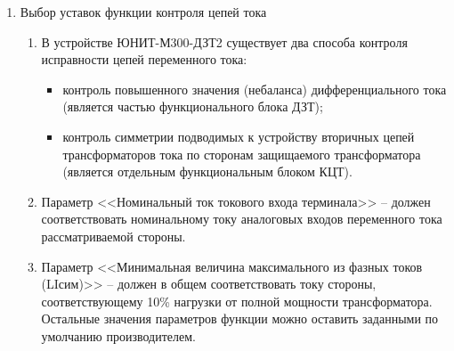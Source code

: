 \begin{enumerate}[label=\arabic{section}.\arabic{enumi}, labelsep=7pt, leftmargin=0pt, itemindent=60pt, align=left, nosep]
\item Выбор уставок функции контроля цепей тока
\begin{enumerate}[label=\arabic{section}.\arabic{enumi}.\arabic*, labelsep=7pt, leftmargin=0em, itemindent=55.5pt, align=left, nosep]
\item
В устройстве ЮНИТ-М300-ДЗТ2 существует два способа контроля исправности цепей переменного тока:
\begin{itemize}
    \item контроль повышенного значения (небаланса) дифференциального тока (является частью функционального блока ДЗТ);
    \item контроль симметрии подводимых к устройству вторичных цепей трансформаторов тока по сторонам защищаемого трансформатора (является отдельным функциональным блоком КЦТ).
\end{itemize}
\item
Параметр <<Номинальный ток токового входа терминала>> – должен соответствовать номинальному току аналоговых входов переменного тока рассматриваемой стороны.
\item
Параметр <<Минимальная величина максимального из фазных токов (LIсим)>> – должен в общем соответствовать току стороны, соответствующему 10\% нагрузки от полной мощности трансформатора.
Остальные значения параметров функции можно оставить заданными по умолчанию производителем.

\end{enumerate}
\end{enumerate}